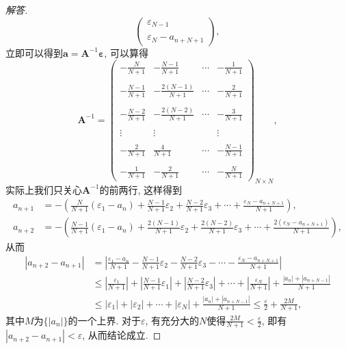 \begin{6a}
\begin{enumerate}
\begin{proof}[解答]
\[\begin{pmatrix}
	\varepsilon_{N-1}\\ \\\varepsilon_{N}-a_{n+N+1}
	\end{pmatrix},\]
    立即可以得到\(\boldsymbol{a}=\boldsymbol{A}^{-1}\boldsymbol{\varepsilon}\), 
    可以算得\[\boldsymbol{A}^{-1}=\begin{pmatrix}
	-\frac{N}{N+1}&-\frac{N-1}{N+1}&\cdots&-\frac{1}{N+1}\\ \\
	-\frac{N-1}{N+1}&-\frac{2(N-1)}{N+1}&\cdots&-\frac{2}{N+1}\\ \\
	-\frac{N-2}{N+1}&-\frac{2(N-2)}{N+1}&\cdots&-\frac{3}{N+1}\\ \\
	\vdots&\vdots&&\vdots\\ \\
	-\frac{2}{N+1}&\frac{4}{N+1}&\cdots&-\frac{N-1}{N+1}\\ \\
	-\frac{1}{N+1}&-\frac{2}{N+1}&\cdots&-\frac{N}{N+1}
	\end{pmatrix}_{N\times N},\]
    实际上我们只关心\(\boldsymbol{A}^{-1}\)的前两行, 这样得到
    \[\begin{split}
	a_{n+1}&=-\left(\frac{N}{N+1}\left(\varepsilon_1-a_n\right)+\frac{N-1}{N+1}\varepsilon_2+\frac{N-2}{N+1}\varepsilon_3+\cdots+\frac{\varepsilon_N-a_{n+N+1}}{N+1}\right),\\
	a_{n+2}&=-\left(\frac{N-1}{N+1}\left(\varepsilon_1-a_n\right)+\frac{2(N-1)}{N+1}\varepsilon_2+\frac{2(N-2)}{N+1}\varepsilon_3+\cdots+\frac{2(\varepsilon_N-a_{n+N+1})}{N+1}\right),
	\end{split}\]从而
	\[\begin{split}
		|a_{n+2}-a_{n+1}|&=\left|\frac{\varepsilon_1-a_n}{N+1}-\frac{N-1}{N+1}\varepsilon_2-\frac{N-2}{N+1}\varepsilon_3-\cdots-\frac{\varepsilon_N-a_{n+N+1}}{N+1}\right|\\
		&\leqslant\left|\frac{\varepsilon_1}{N+1}\right|+\left|\frac{N-1}{N+1}\varepsilon_1\right|+\left|\frac{N-2}{N+1}\varepsilon_3\right|+\cdots+\left|\frac{\varepsilon_N}{N+1}\right|+\frac{|a_n|+|a_{n+N-1}|}{N+1}\\
		&\leqslant|\varepsilon_1|+|\varepsilon_2|+\cdots+|\varepsilon_N|+\frac{|a_n|+|a_{n+N-1}|}{N+1}\leqslant\frac{\varepsilon}{2}+\frac{2M}{N+1},
	\end{split}\]其中\(M\)为\(\{|a_n|\}\)的一个上界. 
    对于\(\varepsilon\), 有充分大的\(N\)使得\(\frac{2M}{N+1}<\frac{\varepsilon}{2}\), 即有\(|a_{n+2}-a_{n+1}|<\varepsilon\), 从而结论成立.
\end{proof}
\end{enumerate}
\end{6a}
